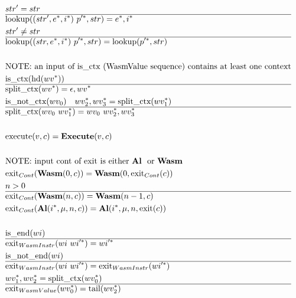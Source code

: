 \begin{align*}
%
  &str' = str \\
  \hline
  &\lookup((str', \seq e, \seq i) ~ \seq{p'}, str) = \seq e, \seq i \\
  &str' \not= str \\
  \hline
  &\lookup((str, \seq e, \seq i) ~ \seq{p'}, str) = \lookup(\seq{p'}, str) \\
%
\newline \\
&\text{NOTE: an input of is\_ctx (WasmValue sequence) contains at least one context} \\
  &\text{is\_ctx}(\text{hd}(\seq{wv})) \\
  \hline
  &\splitctx(\seq{wv}) = \epsilon, \seq{wv} \\
  &\text{is\_not\_ctx}(wv_0) \quad \seq{wv_2}, \seq{wv_3} = \splitctx(\seq{wv_1}) \\
  \hline
  &\splitctx(wv_0 ~ \seq{wv_1}) = wv_0 ~ \seq{wv_2}, \seq{wv_3} \\
%
\newline \\
  &\execute(v, c) = \exe(v, c) \\
%
\newline \\
&\text{NOTE: input cont of exit is either \al ~ or \wasm} \\
  &\exit_{Cont}(\wasm (0, c)) = \wasm(0, \exit_{Cont}(c)) \\
  &n > 0 \\
  \hline
  &\exit_{Cont}(\wasm (n, c)) = \wasm(n-1, c) \\
  &\exit_{Cont}(\al (\seq i, \mu, n, c)) = \al (\seq i, \mu, n, \exit(c)) \\
%
\newline \\
  &\text{is\_end}(wi) \\
  \hline
  &\exit_{WasmInstr}(wi ~ \seq{wi'}) = \seq{wi'} \\
  &\text{is\_not\_end}(wi) \\
  \hline
  &\exit_{WasmInstr}(wi ~ \seq{wi'}) = \exit_{WasmInstr}(\seq{wi'}) \\
%
  &\seq{wv_1}, \seq{wv_2} = \splitctx(\seq{wv_0}) \\
  \hline
  &\exit_{WasmValue}(\seq{wv_0}) = \text{tail}(\seq{wv_2}) \\

\end{align*}
